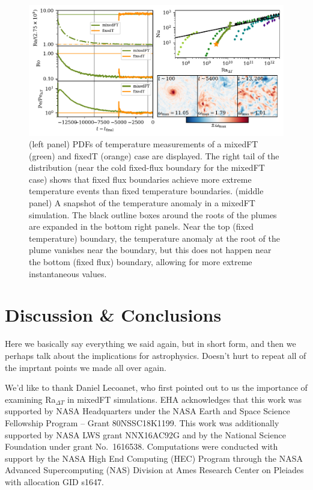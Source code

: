 \documentclass[aps, pre, onecolumn, nofootinbib, notitlepage, groupedaddress, amsfonts, amssymb, amsmath, longbibliography]{revtex4-1}
\begin{document}
\begin{figure}
\includegraphics[width=\textwidth]{./figs/rotating_panels.pdf}
\caption{ 
	(left panel) PDFs of temperature measurements of a mixedFT (green) and fixedT (orange) case are displayed.
	The right tail of the distribution (near the cold fixed-flux boundary for the mixedFT case) shows that fixed flux boundaries achieve more extreme temperature events than fixed temperature boundaries.
	(middle panel) A snapshot of the temperature anomaly in a mixedFT simulation.
	The black outline boxes around the roots of the plumes are expanded in the bottom right panels.
	Near the top (fixed temperature) boundary, the temperature anomaly at the root of the plume vanishes near the boundary, but this does not happen near the bottom (fixed flux) boundary, allowing for more extreme instantaneous values.
\label{fig:rotating_panels} }
\end{figure}



\section{Discussion \& Conclusions}
\label{sec:discussion}

Here we basically say everything we said again, but in short form, and then we perhaps talk about the implications for astrophysics.
Doesn't hurt to repeat all of the imprtant points we made all over again.


\begin{acknowledgments}
We'd like to thank Daniel Lecoanet, who first pointed out to us the importance of examining Ra$_{\Delta T}$ in mixedFT simulations. 
EHA acknowledges that this work was supported by NASA Headquarters under the NASA Earth and Space Science Fellowship Program -- Grant 80NSSC18K1199.
This work was additionally supported by NASA LWS grant NNX16AC92G and by the National Science Foundation under grant No.~1616538. 
Computations were conducted with support by the NASA High End Computing (HEC) Program through the NASA  Advanced Supercomputing (NAS) Division at Ames Research Center on Pleiades with allocation GID s1647.
\end{acknowledgments}
\end{document}
